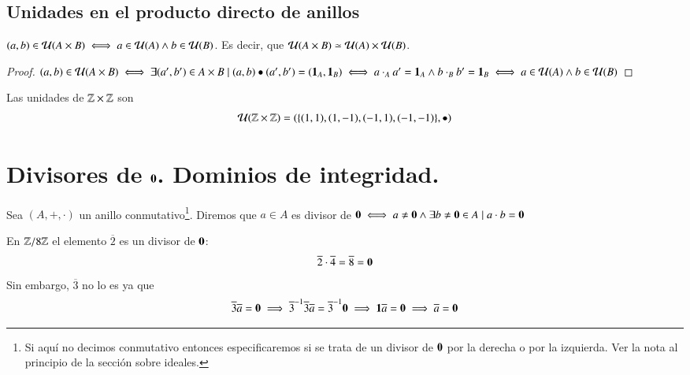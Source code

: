 \subsection{Unidades en el producto directo de anillos}

\begin{pro}
	\label{pro:udsproductodirectoanillos}
	$(a,b) \in \mathcal{U}(A \times B) \iff a \in \mathcal{U}(A) \land b \in \mathcal{U}(B)$. Es decir, que $\mathcal{U}(A \times B) \simeq \mathcal{U}(A) \times \mathcal{U}(B)$.
\end{pro}

\begin{proof}
	$(a,b) \in \mathcal{U}(A \times B) \iff \exists (a',b') \in A\times B \mid (a,b) \bullet (a', b') = (\mathbf{1}_A, \mathbf{1}_B) \iff a\cdot_A a' = \mathbf{1}_A \land b\cdot_B b' = \mathbf{1}_B \iff a \in \mathcal{U}(A) \land b \in \mathcal{U}(B)$
\end{proof}

\begin{ej}
	Las unidades de $\mathbb{Z} \times \mathbb{Z}$ son
	\begin{align*}
	\mathcal{U}(\mathbb{Z} \times \mathbb{Z}) = (\{(1,1), (1,-1), (-1,1), (-1,-1)\}, \bullet)
	\end{align*}
\end{ej}


\section{Divisores de $\mathbf{0}$. Dominios de integridad.}

\begin{dfn}[Divisor de 0]
	Sea $(A, +, \cdot)$ un anillo conmutativo\footnote{Si aquí no decimos conmutativo entonces especificaremos si se trata de un divisor de $\mathbf{0}$ por la derecha o por la izquierda. Ver la nota al principio de la sección sobre ideales.}. Diremos que $a \in A$ es divisor de $\mathbf{0} \iff a \neq \mathbf{0} \land \exists b \neq \mathbf{0} \in A \mid a\cdot b = \mathbf{0}$
\end{dfn}

\begin{ej}
	En $\mathbb{Z}/8\mathbb{Z}$ el elemento $\overline{2}$ es un divisor de $\mathbf{0}$:
	\begin{align*}
		\overline{2}\cdot\overline{4} = \overline{8} = \mathbf{0}
	\end{align*}
	Sin embargo, $\overline{3}$ no lo es ya que
	\begin{align*}
		\overline{3}\overline{a} = \mathbf{0} \implies \overline{3}^{-1}\overline{3}\overline{a} = \overline{3}^{-1}\mathbf{0} \implies \mathbf{1} \overline{a} = \mathbf{0} \implies \overline{a} = \mathbf{0}
	\end{align*}
\end{ej}


